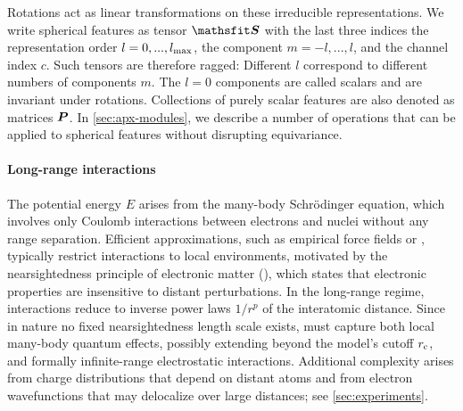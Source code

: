 \documentclass[10pt]{article} %
\begin{document}
Rotations act as linear transformations on these irreducible representations.
We write spherical features as tensor $\tS$ with the last three indices the representation order $l=0,...,l_{\text{max}}$, the component $m=-l,...,l$, and the channel index $c$. Such tensors are therefore ragged: Different $l$ correspond to different numbers of components $m$. The $l=0$ components are called scalars and are invariant under rotations. Collections of purely scalar features are also denoted as matrices ${\bm{P}}$. In \cref{sec:apx-modules}, we describe a number of operations that can be applied to spherical features without disrupting equivariance.

\paragraph{Long-range interactions}
The potential energy $E$ arises from the many-body Schrödinger equation, which involves only Coulomb interactions between electrons and nuclei without any range separation.
Efficient approximations, such as empirical force fields or \mlps, typically restrict interactions to local environments, motivated by the nearsightedness principle of electronic matter (\cite{pk2005}), which states that electronic properties are insensitive to distant perturbations.
In the long-range regime, interactions reduce to inverse power laws $1/r^p$ of the interatomic distance.
Since in nature no fixed nearsightedness length scale exists, \mlps must capture both local many-body quantum effects, possibly extending beyond the model's cutoff $r_{\text{c}}$, and formally infinite-range electrostatic interactions.
Additional complexity arises from charge distributions that depend on distant atoms and from electron wavefunctions that may delocalize over large distances; see \cref{sec:experiments}.
\end{document}
